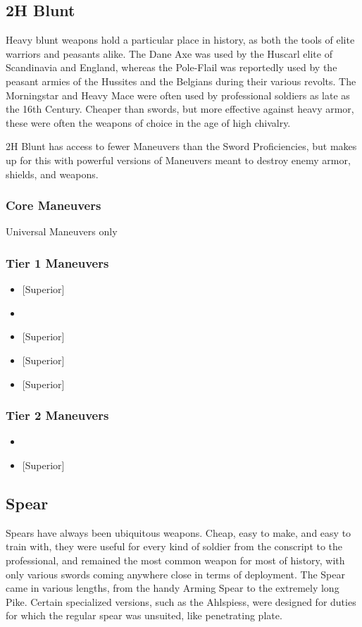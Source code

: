 \documentclass[oneside,11pt,english]{book}
\begin{document}
\subsection{2H Blunt}
Heavy blunt weapons hold a particular place in history, as both the tools of elite warriors and 
peasants alike. The Dane Axe was used by the Huscarl elite of Scandinavia and England, whereas the 
Pole-Flail was reportedly used by the peasant armies of the Hussites and the Belgians during their various 
revolts. The Morningstar and Heavy Mace were often used by professional soldiers as late as the 16th 
Century. Cheaper than swords, but more effective against heavy armor, these were often the weapons of choice in the age of high chivalry.

2H Blunt has access to fewer Maneuvers than the Sword Proficiencies, but makes up for this with 
powerful versions of Maneuvers meant to destroy enemy armor, shields, and weapons. 

\subsubsection{Core Maneuvers}
Universal Maneuvers only

\subsubsection{Tier 1 Maneuvers}
\vspace{-5pt}\begin{itemize}
	[itemsep=0.5mm]
	\item {} [Superior]
	\item {}
	\item {} [Superior]
	\item {} [Superior]
	\item {} [Superior]
\end{itemize}

\subsubsection{Tier 2 Maneuvers}
\vspace{-5pt}\begin{itemize}
	[itemsep=0.5mm]
	\item {}
	\item {} [Superior]
\end{itemize}
\subsection{Spear}
Spears have always been ubiquitous weapons. Cheap, easy to make, and easy to train with, they 
were useful for every kind of soldier from the conscript to the professional, and remained the most 
common weapon for most of history, with only various swords coming anywhere close in terms of 
deployment. The Spear came in various lengths, from the handy Arming Spear to the extremely long Pike. 
Certain specialized versions, such as the Ahlspiess, were designed for duties for which the regular spear 
was unsuited, like penetrating plate. 
\end{document}
